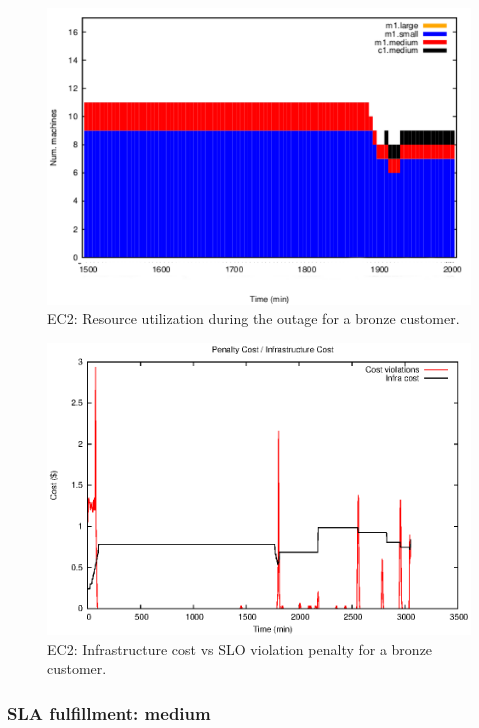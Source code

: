 \begin{figure}
  \begin{center}
    \includegraphics[width=.85\linewidth]{images/exps2011/low/ec2/inst_type_machines_filtered.pdf}
  \end{center}
\vspace{-5mm}
  \caption{EC2: Resource utilization during the outage for a bronze customer.}
  \label{resOutage}
\end{figure}


\begin{figure}
  \begin{center}
    \includegraphics[width=.85\linewidth]{images/exps2011/low/ec2/penaltyVScost.eps}
  \end{center}
\vspace{-5mm}
  \caption{EC2: Infrastructure cost vs SLO violation penalty for a bronze customer.}
  \label{lowPenalty}
\end{figure}

\subsubsection{SLA fulfillment: medium}


